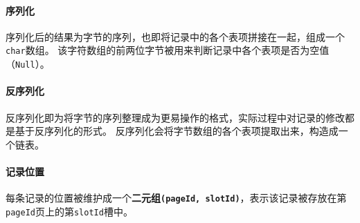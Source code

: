 \documentclass[11pt]{article}
\begin{document}
\paragraph{序列化} 序列化后的结果为字节的序列，也即将记录中的各个表项拼接在一起，组成一个\texttt{char}数组。
该字符数组的前两位字节被用来判断记录中各个表项是否为空值（\texttt{Null}）。
\paragraph{反序列化} 反序列化即为将字节的序列整理成为更易操作的格式，实际过程中对记录的修改都是基于反序列化的形式。
反序列化会将字节数组的各个表项提取出来，构造成一个链表。
\paragraph{记录位置} 每条记录的位置被维护成一个\textbf{二元组\texttt{(pageId, slotId)}}，表示该记录被存放在第\texttt{pageId}页上的第\texttt{slotId}槽中。
\end{document}
